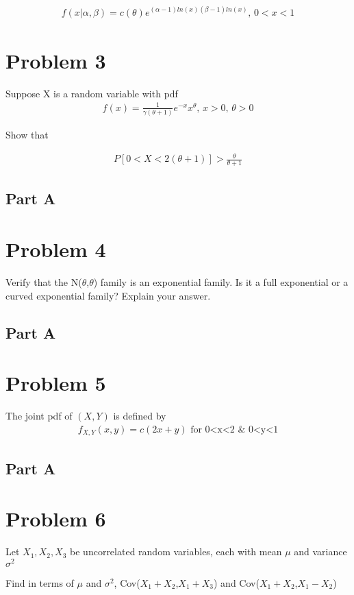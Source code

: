 \documentclass{article}
\begin{document}
\begin{align*}
f(x|\alpha,\beta) = c(\theta) e^{(\alpha-1)ln(x)(\beta-1)ln(x)} \text{, } 0<x<1
\end{align*}

\section*{Problem 3}
Suppose X is a random variable with pdf
\begin{align*}
f(x) = \frac{1}{\gamma(\theta+1)} e^{-x} x^\theta \text{, } x>0 \text{, } \theta>0
\end{align*}

Show that

\begin{align*}
P [0 < X < 2(\theta + 1)] > \frac{\theta}{\theta+1}
\end{align*}
\subsection*{Part A}

\section*{Problem 4}
Verify that the N($\theta$,$\theta$) family is an exponential family. Is it a full exponential or a
curved exponential family? Explain your answer.
\subsection*{Part A}

\section*{Problem 5}
The joint pdf of $(X,Y)$ is defined by
\begin{align*}
f_{X,Y}(x,y) = c(2x+y) \text{ for 0<x<2 & 0<y<1}
\end{align*}
\subsection*{Part A}

\section*{Problem 6}
Let $X_1, X_2, X_3$ be uncorrelated random variables, each with mean $\mu$ and variance
$\sigma^2$

Find in terms of $\mu$ and $\sigma^2$, Cov($X_1+X_2$,$X_1+X_3$) and Cov($X_1+X_2$,$X_1-X_2$)
\end{document}

